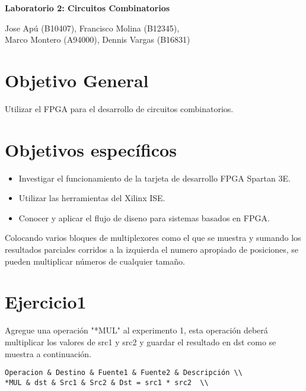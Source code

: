 \documentclass[10pt]{article}
\begin{document}
\begin{huge}
\begin{center}
\textbf{Laboratorio 2: Circuitos Combinatorios}
\end{center}
\end{huge}

\begin{Large}
\begin{center}
Jose Apú (B10407), Francisco Molina (B12345), \\Marco Montero (A94000), Dennis Vargas (B16831)
\end{center}
\end{Large}


\section*{Objetivo General}
Utilizar el FPGA para el desarrollo de circuitos combinatorios.

\section*{Objetivos específicos}
\begin{itemize}
\item Investigar el funcionamiento de la tarjeta de desarrollo FPGA Spartan 3E.
\item Utilizar las herramientas del Xilinx ISE.
\item Conocer y aplicar el flujo de diseno para sistemas basados en FPGA.
\end{itemize}
Colocando varios bloques de multiplexores como el que se muestra y sumando los resultados parciales corridos a la izquierda el numero apropiado de posiciones, se pueden multiplicar números de cualquier tamaño.

\newpage

\section*{Ejercicio1}
 Agregue una operación "*MUL" al experimento 1, esta operación deberá multiplicar los valores de src1 y src2 y guardar el resultado en dst como se muestra a continuación.
\begin{lstlisting}
Operacion & Destino & Fuente1 & Fuente2 & Descripción \\
*MUL & dst & Src1 & Src2 & Dst = src1 * src2  \\
\end{lstlisting}
\end{document}

